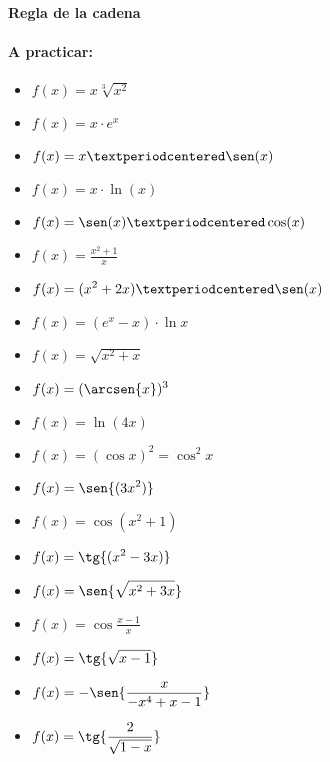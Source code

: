 \paragraph{Regla de la cadena}

\newpage

\paragraph*{A practicar:}
\begin{itemize}
	\item $\displaystyle f(x) = x\sqrt[3]{x^2}$
	\item $\displaystyle f(x) = x·e^x$
	\item $\displaystyle f(x) = x·\sen(x)$
	\item $\displaystyle f(x) = x·\ln(x)$
	\item $\displaystyle f(x) = \sen(x)·\cos(x)$
	\item $\displaystyle f(x) = \frac{x^2+1}{x}$
	\item $\displaystyle f(x) = (x^2+2x)·\sen(x)$
	\item $\displaystyle f(x) = (e^x - x)·\ln{x}$
	\item $\displaystyle f(x) = \sqrt{x^2+x}$
	\item $\displaystyle f(x) = (\arcsen{x})^3$
	\item $\displaystyle f(x) = \ln(4x)$
	\item $\displaystyle f(x) = (\cos{x})^2 = \cos^2{x}$
	\item $\displaystyle f(x) = \sen{(3x^2)}$
	\item $\displaystyle f(x) = \cos{(x^2+1)} $
	\item $\displaystyle f(x) = \tg{(x^2-3x)}$
	\item $\displaystyle f(x) = \sen{\sqrt{x^2+3x}} $
	\item $\displaystyle f(x) =  \cos{\frac{x-1}{x}}$
	\item $\displaystyle f(x) = \tg{\sqrt{x-1}} $
	\item $\displaystyle f(x) = -\sen{\frac{x}{-x^4+x-1}} $
	\item $\displaystyle f(x) = \tg{\frac{2}{\sqrt{1-x}}} $
\end{itemize}
